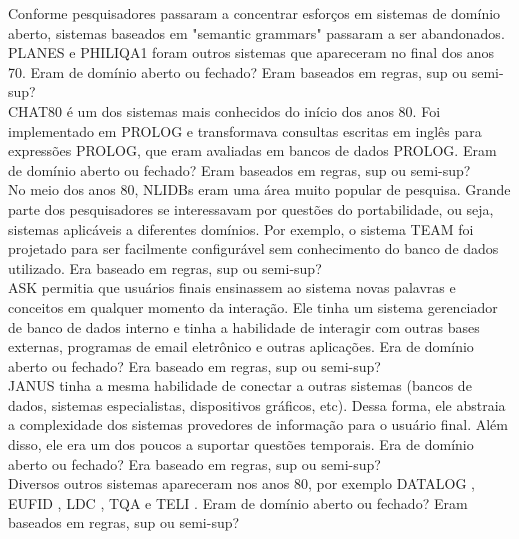 \documentclass{article}
\begin{document}
Conforme pesquisadores passaram a concentrar esforços em sistemas de domínio aberto, sistemas baseados em "semantic grammars" passaram a ser abandonados. PLANES \citep{waltz1978english} e PHILIQA1 \citep{scha1977philips} foram outros sistemas que apareceram no final dos anos 70. Eram de domínio aberto ou fechado? Eram baseados em regras, sup ou semi-sup?\\

CHAT80 \citep{warren1982efficient} é um dos sistemas mais conhecidos do início dos anos 80. Foi implementado em PROLOG e transformava consultas escritas em inglês para expressões PROLOG, que eram avaliadas em bancos de dados PROLOG. Eram de domínio aberto ou fechado? Eram baseados em regras, sup ou semi-sup?\\

No meio dos anos 80, NLIDBs eram uma área muito popular de pesquisa. Grande parte dos pesquisadores se interessavam por questões do portabilidade, ou seja, sistemas aplicáveis a diferentes domínios. Por exemplo, o sistema TEAM \citep{grosz1983team} foi projetado para ser facilmente configurável sem conhecimento do banco de dados utilizado. Era baseado em regras, sup ou semi-sup?\\

ASK \citep{thompson1983introducing} permitia que usuários finais ensinassem ao sistema novas palavras e conceitos em qualquer momento da interação. Ele tinha um sistema gerenciador de banco de dados interno e tinha a habilidade de interagir com outras bases externas, programas de email eletrônico e outras aplicações. Era de domínio aberto ou fechado? Era baseado em regras, sup ou semi-sup?\\

JANUS \citep{hinrichs1988tense} tinha a mesma habilidade de conectar a outras sistemas (bancos de dados, sistemas especialistas, dispositivos gráficos, etc). Dessa forma, ele abstraia a complexidade dos sistemas provedores de informação para o usuário final. Além disso, ele era um dos poucos a suportar questões temporais. Era de domínio aberto ou fechado? Era baseado em regras, sup ou semi-sup?\\

Diversos outros sistemas apareceram nos anos 80, por exemplo DATALOG \citep{hafner1984interaction}, EUFID \citep{templeton1983problems}, LDC \citep{ballard1984ldc}, TQA \citep{damerau1981operating} e TELI \citep{ballard1986semantic}. Eram de domínio aberto ou fechado? Eram baseados em regras, sup ou semi-sup?\\
\end{document}
